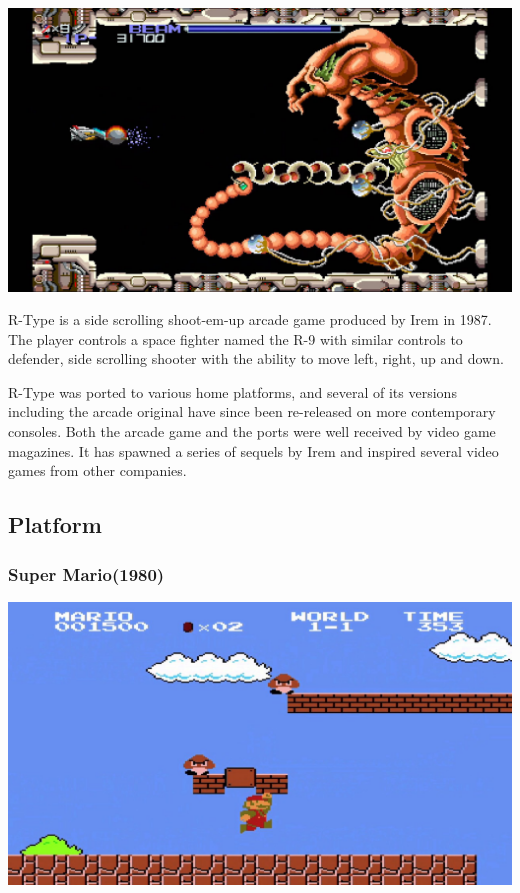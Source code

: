\documentclass{article}
\begin{document}
\includegraphics [scale=0.3]{rtype} \newline

R-Type is a side scrolling shoot-em-up arcade game produced by Irem in 1987. The player controls a space fighter named the R-9 with similar controls to defender, side scrolling shooter with the ability to move left, right, up and down.

R-Type was ported to various home platforms, and several of its versions including the arcade original have since been re-released on more contemporary consoles. Both the arcade game and the ports were well received by video game magazines. It has spawned a series of sequels by Irem and inspired several video games from other companies.

\clearpage		
			
\subsection{Platform}
\subsubsection{Super Mario(1980)}

\includegraphics [scale=0.3]{mario} \newline
\end{document}
